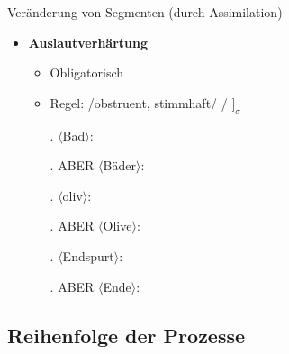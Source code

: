 \begin{frame}
{Veränderung von Segmenten (durch Assimilation)}

\begin{itemize}
	\item \textbf{Auslautverhärtung}

	\begin{itemize}
		\item Obligatorisch
		\item Regel: /obstruent, stimmhaft/  / \underline{\quad} $]_\sigma$

		
		\ex. $\langle$Bad$\rangle$:  \ras \textipa{[ba:t]}
		
		\ex. ABER $\langle$Bäder$\rangle$:  \ras \textipa{[bE:.d5]}
		
		\ex. $\langle$oliv$\rangle$:  \ras \textipa{[Po.li:f]}
		
		\ex. ABER $\langle$Olive$\rangle$:  \ras \textipa{[Po.li:.v@]}
		
		\ex. $\langle$Endspurt$\rangle$:  \ras {}
		
		\ex. ABER $\langle$Ende$\rangle$:  \ras \textipa{[PEn.d@]}

	\end{itemize}

\end{itemize}

\end{frame}



%
\subsection{Reihenfolge der Prozesse}
%


